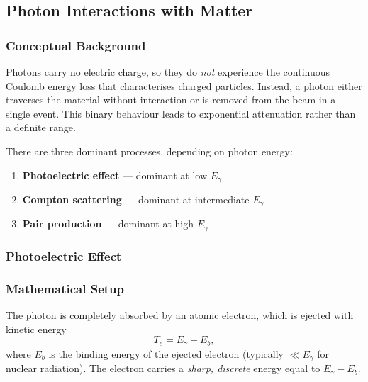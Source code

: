 
\subsection{Photon Interactions with Matter}
\label{subsec:lec06:photons}

\subsubsection*{Conceptual Background}
Photons carry no electric charge, so they do \emph{not} experience the
continuous Coulomb energy loss that characterises charged particles.  Instead,
a photon either traverses the material without interaction or is removed from
the beam in a single event.  This binary behaviour leads to exponential
attenuation rather than a definite range.

There are three dominant processes, depending on photon energy:

\begin{enumerate}
  \item \textbf{Photoelectric effect} — dominant at low $E_\gamma$
  \item \textbf{Compton scattering} — dominant at intermediate $E_\gamma$
  \item \textbf{Pair production} — dominant at high $E_\gamma$
\end{enumerate}

\subsubsection{Photoelectric Effect}
\label{subsubsec:lec06:photo}

\subsubsection*{Mathematical Setup}
The photon is completely absorbed by an atomic electron, which is ejected with
kinetic energy
\begin{equation}
  \label{eq:lec06:photoelectric}
  \boxed{T_e = E_\gamma - E_b,}
\end{equation}
where $E_b$ is the binding energy of the ejected electron (typically $\ll
E_\gamma$ for nuclear radiation).  The electron carries a \emph{sharp, discrete}
energy equal to $E_\gamma - E_b$.

